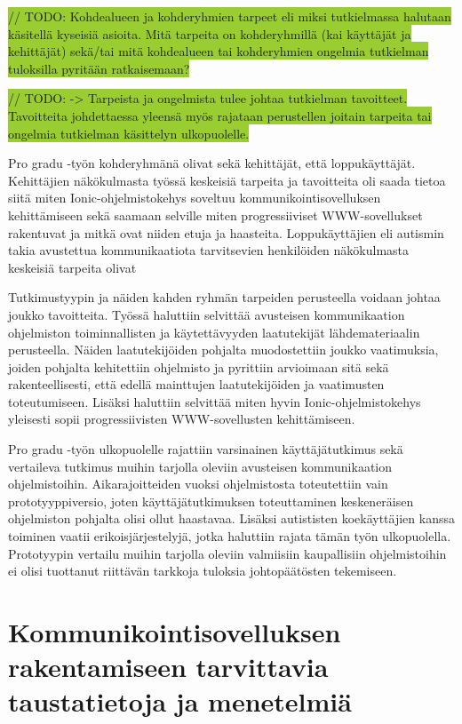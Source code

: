 \documentclass[utf8]{gradu3}
\begin{document}
\colorbox{YellowGreen}{// TODO: Kohdealueen ja kohderyhmien tarpeet eli miksi tutkielmassa halutaan käsitellä kyseisiä asioita. Mitä tarpeita on kohderyhmillä (kai käyttäjät ja kehittäjät) sekä/tai mitä kohdealueen tai kohderyhmien ongelmia tutkielman tuloksilla pyritään ratkaisemaan?}

\colorbox{YellowGreen}{// TODO: -> Tarpeista ja ongelmista tulee johtaa tutkielman tavoitteet. Tavoitteita johdettaessa yleensä myös rajataan perustellen joitain tarpeita tai ongelmia tutkielman käsittelyn ulkopuolelle.}

Pro gradu -työn kohderyhmänä olivat sekä kehittäjät, että loppukäyttäjät. Kehittäjien näkökulmasta työssä keskeisiä tarpeita ja tavoitteita oli saada tietoa siitä miten Ionic-ohjelmistokehys soveltuu kommunikointisovelluksen kehittämiseen sekä saamaan selville miten progressiiviset WWW-sovellukset rakentuvat ja mitkä ovat niiden etuja ja haasteita. Loppukäyttäjien eli autismin takia avustettua kommunikaatiota tarvitsevien henkilöiden näkökulmasta keskeisiä tarpeita olivat 

Tutkimustyypin ja näiden kahden ryhmän tarpeiden perusteella voidaan johtaa joukko tavoitteita. Työssä haluttiin selvittää avusteisen kommunikaation ohjelmiston toiminnallisten ja käytettävyyden laatutekijät lähdemateriaalin perusteella. Näiden laatutekijöiden pohjalta muodostettiin joukko vaatimuksia, joiden pohjalta kehitettiin ohjelmisto ja pyrittiin arvioimaan sitä sekä rakenteellisesti, että edellä mainttujen laatutekijöiden ja vaatimusten toteutumiseen. Lisäksi haluttiin selvittää miten hyvin Ionic-ohjelmistokehys yleisesti sopii progressiivisten WWW-sovellusten kehittämiseen.

Pro gradu -työn ulkopuolelle rajattiin varsinainen käyttäjätutkimus sekä vertaileva tutkimus muihin tarjolla oleviin avusteisen kommunikaation ohjelmistoihin. Aikarajoitteiden vuoksi ohjelmistosta toteutettiin vain prototyyppiversio, joten käyttäjätutkimuksen toteuttaminen keskeneräisen ohjelmiston pohjalta olisi ollut haastavaa. Lisäksi autististen koekäyttäjien kanssa toiminen vaatii erikoisjärjestelyjä, jotka haluttiin rajata tämän työn ulkopuolella. Prototyypin vertailu muihin tarjolla oleviin valmiisiin kaupallisiin ohjelmistoihin ei olisi tuottanut riittävän tarkkoja tuloksia johtopäätösten tekemiseen.

\chapter{Kommunikointisovelluksen rakentamiseen tarvittavia taustatietoja ja menetelmiä}
\end{document}
